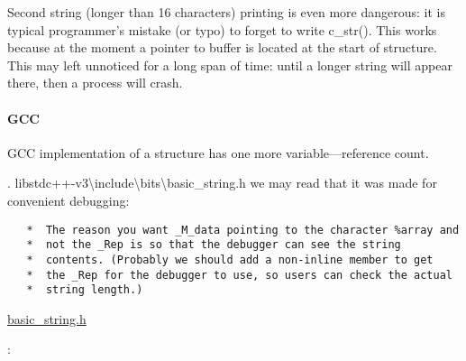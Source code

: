 {Second string (longer than 16 characters) printing is even more dangerous: it is typical programmer's mistake
(or typo) to forget to write c\_str()}.
{This works because at the moment a pointer to buffer is located at the start of structure}.
{This may left unnoticed for a long span of time: until a longer string will appear there, then a process will crash}.

\paragraph{GCC}

{GCC implementation of a structure has one more variable---reference count}.

.
 libstdc++-v3\textbackslash{}include\textbackslash{}bits\textbackslash{}basic\_string.h 
{we may read that it was made for convenient debugging}:

\begin{lstlisting}
   *  The reason you want _M_data pointing to the character %array and
   *  not the _Rep is so that the debugger can see the string
   *  contents. (Probably we should add a non-inline member to get
   *  the _Rep for the debugger to use, so users can check the actual
   *  string length.)
\end{lstlisting}

\href{http://gcc.gnu.org/onlinedocs/libstdc++/libstdc++-html-USERS-4.4/a01068.html}
{basic\_string.h}

:



